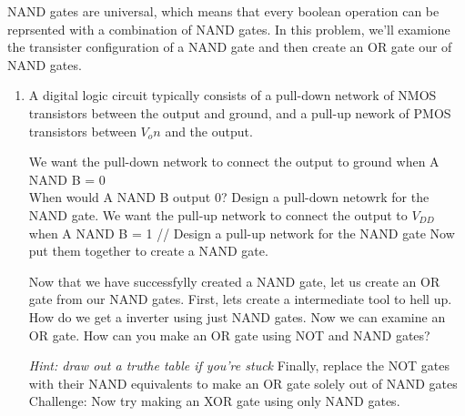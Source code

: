 
NAND gates are universal, which means that every boolean operation can be reprsented with a combination of NAND gates. In this problem, we'll examione the transister configuration of a NAND gate and then create an OR gate our of NAND gates. 

\begin{enumerate}
    \item A digital logic circuit typically consists of a pull-down network of NMOS transistors between the output and ground, and a pull-up nework of PMOS transistors between $V_on$ and the output. 
    \begin{enumerate}
        \qitem We want the pull-down network to connect the output to ground when A NAND B = 0 \\
        When would A NAND B output 0? Design a pull-down netowrk for the NAND gate. 
        \qitem We want the pull-up network to connect the output to $V_{DD}$ when A NAND B = 1 //
        Design a pull-up network for the NAND gate
        \sol{
        
        }
        \qitem Now put them together to create a NAND gate.
        \sol{}
    \end{enumerate}
    Now that we have successfylly created a NAND gate, let us create an OR gate from our NAND gates. 
    \qitem First, lets create a intermediate tool to hell up. How do we get a inverter using just NAND gates.
    \qitem Now we can examine an OR gate. How can you make an OR gate using NOT and NAND gates?
    
    \emph{Hint: draw out a truthe table if you're stuck}
    \qitem Finally, replace the NOT gates with their NAND equivalents to make an OR gate solely out of NAND gates
    \qitem Challenge: Now try making an XOR gate using only NAND gates.
\end{enumerate}
